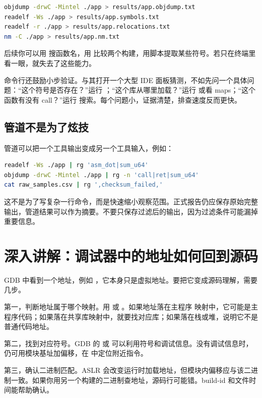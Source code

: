 \begin{lstlisting}[language=bash]
objdump -drwC -Mintel ./app > results/app.objdump.txt
readelf -Ws ./app > results/app.symbols.txt
readelf -r ./app > results/app.relocations.txt
nm -C ./app > results/app.nm.txt
\end{lstlisting}

后续你可以用  搜函数名，用  比较两个构建，用脚本提取某些符号。若只在终端里看一眼，就失去了这些能力。

命令行还鼓励小步验证。与其打开一个大型 IDE 面板猜测，不如先问一个具体问题：“这个符号是否存在？”运行 ；“这个库从哪里加载？”运行  或看 maps；“这个函数有没有 call？”运行  搜索。每个问题小，证据清楚，排查速度反而更快。

\subsection{管道不是为了炫技}

管道可以把一个工具输出变成另一个工具输入，例如：

\begin{lstlisting}[language=bash]
readelf -Ws ./app | rg 'asm_dot|sum_u64'
objdump -drwC -Mintel ./app | rg -n 'call|ret|sum_u64'
cat raw_samples.csv | rg ',checksum_failed,'
\end{lstlisting}

这不是为了写复杂一行命令，而是快速缩小观察范围。正式报告仍应保存原始完整输出，管道结果可以作为摘要。不要只保存过滤后的输出，因为过滤条件可能漏掉重要信息。

\section{深入讲解：调试器中的地址如何回到源码}

GDB 中看到一个地址，例如 ，它本身只是虚拟地址。要把它变成源码理解，需要几步。

第一，判断地址属于哪个映射。用  或 。如果地址落在主程序  映射中，它可能是主程序代码；如果落在共享库映射中，就要找对应库；如果落在栈或堆，说明它不是普通代码地址。

第二，找到对应符号。GDB 的  或  可以利用符号和调试信息。没有调试信息时，仍可用模块基址加偏移，在  中定位附近指令。

第三，确认二进制匹配。ASLR 会改变运行时加载地址，但模块内偏移应与该二进制一致。如果你用另一个构建的二进制查地址，源码行可能错。build-id 和文件时间能帮助确认。

